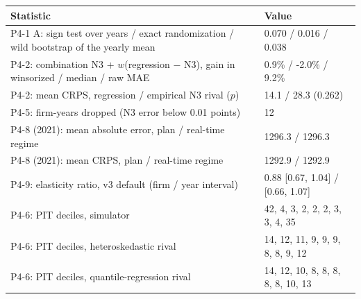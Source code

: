 \begin{tabular}{ll}
\toprule
Statistic & Value \\
\midrule
P4-1 A: sign test over years / exact randomization / wild bootstrap of the yearly mean & 0.070 / 0.016 / 0.038 \\
P4-2: combination N3 + $w$(regression $-$ N3), gain in winsorized / median / raw MAE & 0.9\% / -2.0\% / 9.2\% \\
P4-2: mean CRPS, regression / empirical N3 rival ($p$) & 14.1 / 28.3 (0.262) \\
P4-5: firm-years dropped (N3 error below 0.01 points) & 12 \\
P4-8 (2021): mean absolute error, plan / real-time regime & 1296.3 / 1296.3 \\
P4-8 (2021): mean CRPS, plan / real-time regime & 1292.9 / 1292.9 \\
P4-9: elasticity ratio, v3 default (firm / year interval) & 0.88 [0.67, 1.04] / [0.66, 1.07] \\
P4-6: PIT deciles, simulator & 42, 4, 3, 2, 2, 2, 3, 3, 4, 35 \\
P4-6: PIT deciles, heteroskedastic rival & 14, 12, 11, 9, 9, 9, 8, 8, 9, 12 \\
P4-6: PIT deciles, quantile-regression rival & 14, 12, 10, 8, 8, 8, 8, 8, 10, 13 \\
\bottomrule
\end{tabular}
